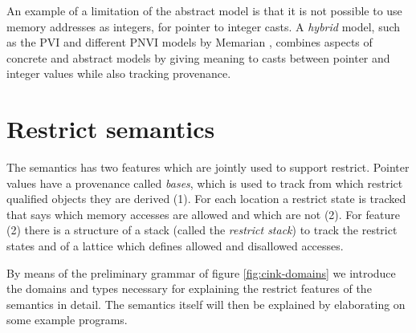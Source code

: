 An example of a limitation of the abstract model is that it is not possible to use memory addresses as integers, \eg for pointer to integer casts.
A \textit{hybrid} model, such as the PVI and different PNVI models by Memarian \etall \cite{memarian2019exploring, sewellc}, combines aspects of 
concrete and abstract models by giving meaning to casts between pointer and integer values while also tracking provenance. 

\section{Restrict semantics}\label{sec:restrict-sem}
The \cink{} semantics has two features which are jointly used to support restrict.
Pointer values have a provenance called \textit{bases}, which is used to track from which
restrict qualified objects they are derived (1).
For each location a restrict state is tracked that says which memory accesses are allowed and which are not (2).
For feature (2) there is a structure of a stack (called the \textit{restrict stack}) to track the restrict states 
and of a lattice which defines allowed and disallowed accesses.

By means of the preliminary grammar of figure \ref{fig:cink-domains} we introduce the
domains and types necessary for explaining the restrict features of the \cink{} semantics in detail.
The semantics itself will then be explained by elaborating on some example programs.

